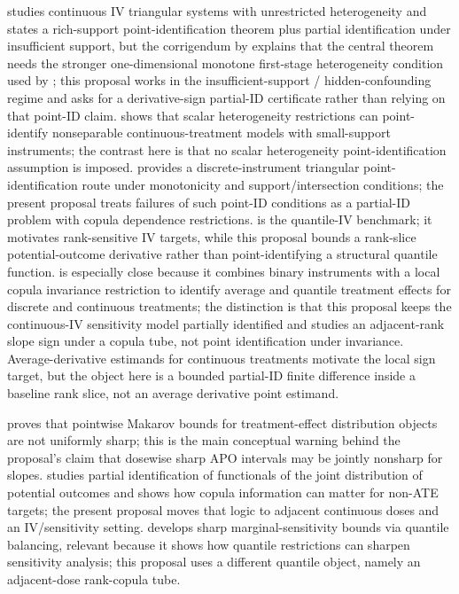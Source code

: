 \documentclass[11pt]{article}
\theoremstyle{definition}
\theoremstyle{plain}
\theoremstyle{remark}
\begin{document}
\citet{Kasy2014} studies continuous IV triangular systems with unrestricted heterogeneity and states a rich-support point-identification theorem plus partial identification under insufficient support, but the corrigendum by \citet{HoderleinHolzmannKasyMeister2017} explains that the central theorem needs the stronger one-dimensional monotone first-stage heterogeneity condition used by \citet{ImbensNewey2009}; this proposal works in the insufficient-support / hidden-confounding regime and asks for a derivative-sign partial-ID certificate rather than relying on that point-ID claim.  \citet{Torgovitsky2015} shows that scalar heterogeneity restrictions can point-identify nonseparable continuous-treatment models with small-support instruments; the contrast here is that no scalar heterogeneity point-identification assumption is imposed.  \citet{DHaultfoeuilleFevrier2015} provides a discrete-instrument triangular point-identification route under monotonicity and support/intersection conditions; the present proposal treats failures of such point-ID conditions as a partial-ID problem with copula dependence restrictions.  \citet{ChernozhukovHansen2005} is the quantile-IV benchmark; it motivates rank-sensitive IV targets, while this proposal bounds a rank-slice potential-outcome derivative rather than point-identifying a structural quantile function.  \citet{ChernozhukovFernandezValHanWuthrich2024} is especially close because it combines binary instruments with a local copula invariance restriction to identify average and quantile treatment effects for discrete and continuous treatments; the distinction is that this proposal keeps the continuous-IV sensitivity model partially identified and studies an adjacent-rank slope sign under a copula tube, not point identification under invariance.  Average-derivative estimands for continuous treatments motivate the local sign target, but the object here is a bounded partial-ID finite difference inside a baseline rank slice, not an average derivative point estimand.

\citet{FirpoRidder2019} proves that pointwise Makarov bounds for treatment-effect distribution objects are not uniformly sharp; this is the main conceptual warning behind the proposal's claim that dosewise sharp APO intervals may be jointly nonsharp for slopes.  \citet{FanGuerreZhu2017} studies partial identification of functionals of the joint distribution of potential outcomes and shows how copula information can matter for non-ATE targets; the present proposal moves that logic to adjacent continuous doses and an IV/sensitivity setting.  \citet{DornGuo2023} develops sharp marginal-sensitivity bounds via quantile balancing, relevant because it shows how quantile restrictions can sharpen sensitivity analysis; this proposal uses a different quantile object, namely an adjacent-dose rank-copula tube.
\end{document}
